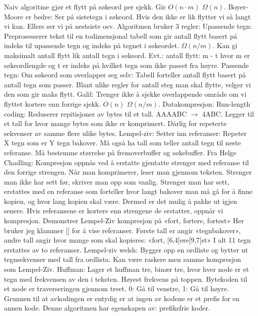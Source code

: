 \documentclass[10pt,a4paper]{article}
\begin{document}
\begin{multicols}{4}
{Naiv algoritme gjør et flytt på søkeord per sjekk. Gir $O(n \cdot m)$ $\Omega(n)$. \color{orange}Boyer-Moore \color{black} er bedre: Ser på sistetegn i søkeord. Hvis den ikke er lik flytter vi så langt vi kan. Ellers ser vi på nestsiste osv. Algoritmen bruker 3 regler: 
\color{orange}Upassende tegn: \color{black}
Preprosesserer tekst til en todimensjonal tabell som gir antall flytt basert på indeks til upassende tegn og indeks på tegnet i søkeordet. $\Omega(n/m)$. Kan gi maksimalt antall flytt lik antall tegn i søkeord. Evt.: antall flytt: m - t hvor m er søkeordlengde og t er indeks på hvilket tegn som ikke passet fra høyre.
\color{orange}Passende tegn: \color{black}
Om søkeord som overlapper seg selv: Tabell forteller antall flytt basert på antall tegn som passer. Blant ulike regler for antall steg man skal flytte, velger vi den som gir maks flytt.
\color{orange} Galil: \color{black}
Trenger ikke å sjekke overlappende område om vi flyttet kortere enn forrige sjekk. $O(n)$ $\Omega(n/m)$.
\color{red}Datakompresjon: \color{black}
\color{orange}Run-length coding: \color{black}
Reduserer repitisjoner av bytes til et tall. AAAABC $\rightarrow$ 4ABC. Legger til et tall for hvor mange bytes som ikke er komprimert. Dårlig for repeterte sekvenser av samme flere ulike bytes.
\color{orange}Lempel-ziv: \color{black}
Setter inn referanser: Repeter X tegn som er Y tegn bakover. Må også ha tall som teller antall tegn til neste referanse. Må bestemme størrelse på fremoverbuffer og søkebuffer. Fra Helge Chadling: Kompresjon oppnås ved å erstatte gjentatte strenger med referanse til den forrige strengen. Når man komprimerer, leser man gjennom teksten. Strenger man ikke har sett før, skriver man opp som vanlig. Strenger man har sett, erstattes med en referanse som forteller hvor langt bakover man må gå for å finne kopien, og hvor lang kopien skal være. Dermed er det mulig å pakke ut igjen senere. Hvis referansene er kortere enn strengene de erstatter, oppnår vi kompresjon. Demonstrer Lempel-Ziv kompresjon på «fort, fortere, fortest» Her bruker jeg klammer [] for å vise referanser. Første tall er angir «tegnbakover», andre tall angir hvor mange som skal kopieres: «fort, [6,4]ere[9,7]st» I alt 11 tegn erstattes av to referanser.
\color{orange}Lempel-ziv welsh: \color{black}
Bygger opp en ordliste og bytter ut tegnsekvenser med tall fra ordlista. Kan være raskere men samme kompresjon som Lempel-Ziv.
\color{orange}Huffman: \color{black}
Lager et huffman tre, binær tre, hvor hver node er et tegn med frekvensen av den i teksten. Høyest frekvens på toppen. Bytekoden til et node er traverseringen gjennom treet. 0: Gå til venstre, 1: Gå til høyre. Grunnen til at avkodingen er entydig er at ingen av kodene er et prefis for en annen kode. Denne algoritmen har egenskapen av: prefiksfrie koder. 
}
\end{multicols}
\end{document}
